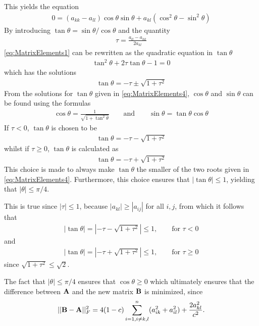 This yields the equation
\begin{align}
	0 = (a_{kk} - a_{ll} ) \cos \theta \sin \theta + a_{kl} (\cos ^2 \theta - \sin ^2 \theta )
	\label{eq:MatrixElements1}
\end{align}
By introducing $\tan \theta = \sin \theta / \cos \theta$ and the quantity
\begin{align}
	\tau = \frac{a_{ll}-a_{kk}}{2a_{kl}}
	\label{eq:MatrixElements2}
\end{align}
\eqref{eq:MatrixElements1} can be rewritten as the quadratic equation in $\tan \theta$
\begin{align}
	\tan ^2 \theta + 2 \tau \tan \theta - 1 = 0
	\label{eq:MatrixElements3}
\end{align}
which has the solutions
\begin{align}
	\tan \theta = -\tau \pm \sqrt{1 + \tau ^2}
	\label{eq:MatrixElements4}
\end{align}
From the solutions for $\tan \theta$ given in \eqref{eq:MatrixElements4}, $\cos \theta$ and $\sin \theta$ can be found using the formulas 
\begin{align*}
	\cos \theta = \frac{1}{\sqrt{1+\tan ^2 \theta}} \qquad \text{and} \qquad \sin \theta = \tan \theta \cos \theta
\end{align*}
If $\tau < 0$, $\tan \theta$ is chosen to be
\begin{align}
	\tan \theta = -\tau - \sqrt{1 + \tau ^2}
	\label{eq:MatrixElements4}
\end{align}
whilst if $\tau \geq 0$, $\tan \theta$ is calculated as
\begin{align}
	\tan \theta = -\tau + \sqrt{1 + \tau ^2}
	\label{eq:MatrixElements4}
\end{align}
This choice is made to always make $\tan \theta$ the smaller of the two roots given in \eqref{eq:MatrixElements4}.
Furthermore, this choice ensures that $|\tan \theta | \leq 1$, yielding that $|\theta| \leq \pi/4$.

This is true since $|\tau| \leq 1$, because $|a_{kl}| \geq |a_{ij}|$ for all $i, j$, from which it follows that
\begin{align}
	|\tan \theta| = \left|-\tau - \sqrt{1 + \tau ^2}\right| 
	\leq 1 , \qquad \text{for } \tau < 0
\end{align}   
and
\begin{align}
	|\tan \theta| = \left|-\tau + \sqrt{1 + \tau ^2}\right|
	\leq 1 , \qquad \text{for } \tau \geq 0
\end{align} 
since $\sqrt{1+\tau^2} \leq \sqrt{2}$.

The fact that $|\theta| \leq \pi/4$ ensures that $\cos \theta \geq 0$ which ultimately ensures that the difference between $\mbox{\textbf{A}}$ and the new matrix $\mbox{\textbf{B}}$ is minimized, since
\begin{align}
	||\mbox{\textbf{B}}-\mbox{\textbf{A}}||_F^2=4(1-c)\sum_{i=1,i\ne k,l}^n(a_{ik}^2+a_{il}^2) +\frac{2a_{kl}^2}{c^2}.
\end{align}
